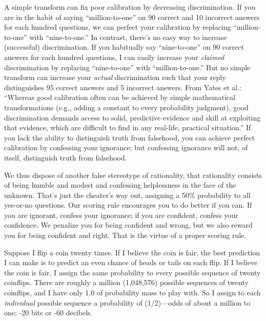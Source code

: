 {
 A simple transform can fix poor calibration by decreasing
discrimination. If you are in the habit of saying
``million-to-one'' on 90 correct and
10 incorrect answers for each hundred questions, we can perfect your
calibration by replacing
``million-to-one'' with
``nine-to-one.'' In contrast,
there's no easy way to increase (successful)
discrimination. If you habitually say
``nine-to-one'' on 90 correct
answers for each hundred questions, I can easily increase your
\textit{claimed} discrimination by replacing
``nine-to-one'' with
``million-to-one.'' But no simple
transform can increase your \textit{actual} discrimination such that
your reply distinguishes 95 correct answers and 5 incorrect answers.
From Yates et al.: ``Whereas good
calibration often can be achieved by simple mathematical
transformations (e.g., adding a constant to every probability
judgment), good discrimination demands access to solid, predictive
evidence and skill at exploiting that evidence, which are difficult to
find in any real-life, practical situation.'' If you
lack the ability to distinguish truth from falsehood, you can achieve
perfect calibration by confessing your ignorance; but confessing
ignorance will not, of itself, distinguish truth from falsehood.}

{
 We thus dispose of another false stereotype of rationality, that
rationality consists of being humble and modest and confessing
helplessness in the face of the unknown. That's just
the cheater's way out, assigning a 50\% probability to
all yes-or-no questions. Our scoring rule encourages you to do better
if you can. If you are ignorant, confess your ignorance; if you are
confident, confess your confidence. We penalize you for being confident
and wrong, but we also reward you for being confident and right. That
is the virtue of a proper scoring rule.}

{
 Suppose I flip a coin twenty times. If I believe the coin is fair,
the best prediction I can make is to predict an even chance of heads or
tails on each flip. If I believe the coin is fair, I assign the same
probability to every possible sequence of twenty coinflips. There are
roughly a million (1,048,576) possible sequences of twenty coinflips,
and I have only 1.0 of probability mass to play with. So I assign to
each \textit{individual} possible sequence a probability of
(1$/$2)---odds of about a million to one; -20
bits or -60 decibels.}


